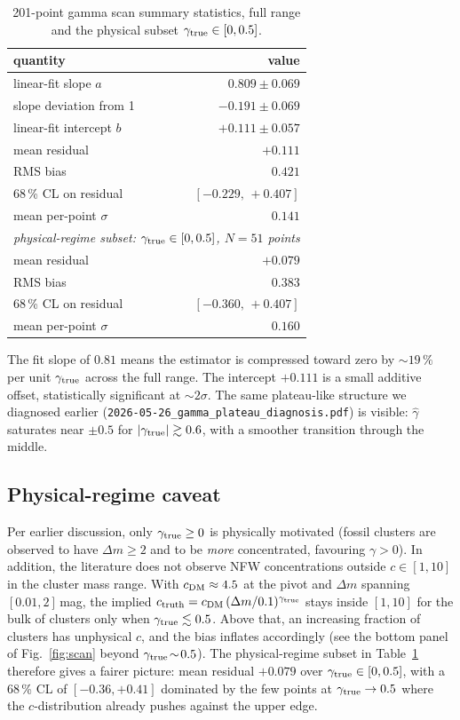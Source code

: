 \documentclass[11pt,a4paper]{article}
\newcommand{\gtrue}{\gamma_{\rm true}}
\newcommand{\ghat}{\hat\gamma}
\newcommand{\dm}{\Delta m}
\begin{document}
\begin{table}[htbp]
  \centering
  \begin{tabular}{lr}
    \toprule
    quantity & value\\
    \midrule
    linear-fit slope $a$ & $0.809 \pm 0.069$\\
    slope deviation from 1   & $-0.191 \pm 0.069$\\
    linear-fit intercept $b$ & $+0.111 \pm 0.057$\\
    mean residual            & $+0.111$\\
    RMS bias                 & $0.421$\\
    68\,\% CL on residual    & $[-0.229,\,+0.407]$\\
    mean per-point $\sigma$  & $0.141$\\
    \midrule
    \multicolumn{2}{l}{\emph{physical-regime subset: $\gtrue\in[0,0.5]$,
    $N=51$ points}}\\
    mean residual            & $+0.079$\\
    RMS bias                 & $0.383$\\
    68\,\% CL on residual    & $[-0.360,\,+0.407]$\\
    mean per-point $\sigma$  & $0.160$\\
    \bottomrule
  \end{tabular}
  \caption{201-point gamma scan summary statistics, full range and the
  physical subset $\gtrue\in[0,0.5]$.}
  \label{tab:scan-summary}
\end{table}

The fit slope of $0.81$ means the estimator is compressed toward zero by
$\sim 19\,\%$ per unit $\gtrue$ across the full range.  The intercept
$+0.111$ is a small additive offset, statistically significant at
$\sim 2\sigma$.  The same plateau-like structure we diagnosed earlier
(\texttt{2026-05-26\_gamma\_plateau\_diagnosis.pdf}) is visible: $\ghat$
saturates near $\pm 0.5$ for $|\gtrue| \gtrsim 0.6$, with a smoother
transition through the middle.

\subsection{Physical-regime caveat}

Per earlier discussion, only $\gtrue \ge 0$ is physically motivated (fossil
clusters are observed to have $\dm \ge 2$ and to be \emph{more} concentrated,
favouring $\gamma>0$).  In addition, the literature does not observe NFW
concentrations outside $c\in[1,10]$ in the cluster mass range.  With
$c_{\rm DM}\approx 4.5$ at the pivot and $\dm$ spanning $[0.01,2]$\,mag,
the implied $c_{\rm truth} = c_{\rm DM}\,(\dm/0.1)^{\gtrue}$ stays
inside $[1,10]$ for the bulk of clusters only when $\gtrue\lesssim 0.5$.
Above that, an increasing fraction of clusters has unphysical $c$, and the
bias inflates accordingly (see the bottom panel of Fig.~\ref{fig:scan}
beyond $\gtrue\!\sim\!0.5$).  The physical-regime subset in
Table~\ref{tab:scan-summary} therefore gives a fairer picture: mean residual
$+0.079$ over $\gtrue\in[0,0.5]$, with a 68\,\% CL of $[-0.36,+0.41]$
dominated by the few points at $\gtrue\to 0.5$ where the $c$-distribution
already pushes against the upper edge.
\end{document}
